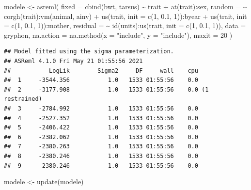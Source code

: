 \documentclass[
  12pt,
]{book}
\newenvironment{Shaded}{\begin{snugshade}}{\end{snugshade}}
\newcommand{\AttributeTok}[1]{\textcolor[rgb]{0.77,0.63,0.00}{#1}}
\newcommand{\DecValTok}[1]{\textcolor[rgb]{0.00,0.00,0.81}{#1}}
\newcommand{\FloatTok}[1]{\textcolor[rgb]{0.00,0.00,0.81}{#1}}
\newcommand{\FunctionTok}[1]{\textcolor[rgb]{0.00,0.00,0.00}{#1}}
\newcommand{\NormalTok}[1]{#1}
\newcommand{\OtherTok}[1]{\textcolor[rgb]{0.56,0.35,0.01}{#1}}
\newcommand{\SpecialCharTok}[1]{\textcolor[rgb]{0.00,0.00,0.00}{#1}}
\newcommand{\StringTok}[1]{\textcolor[rgb]{0.31,0.60,0.02}{#1}}
\begin{document}
\begin{Shaded}
\begin{Highlighting}[]
\NormalTok{modele }\OtherTok{\textless{}{-}} \FunctionTok{asreml}\NormalTok{(}
  \AttributeTok{fixed =} \FunctionTok{cbind}\NormalTok{(bwt, tarsus) }\SpecialCharTok{\textasciitilde{}}\NormalTok{ trait }\SpecialCharTok{+} \FunctionTok{at}\NormalTok{(trait)}\SpecialCharTok{:}\NormalTok{sex,}
  \AttributeTok{random =} \SpecialCharTok{\textasciitilde{}} \FunctionTok{corgh}\NormalTok{(trait)}\SpecialCharTok{:}\FunctionTok{vm}\NormalTok{(animal, ainv) }\SpecialCharTok{+}
    \FunctionTok{us}\NormalTok{(trait, }\AttributeTok{init =} \FunctionTok{c}\NormalTok{(}\DecValTok{1}\NormalTok{, }\FloatTok{0.1}\NormalTok{, }\DecValTok{1}\NormalTok{))}\SpecialCharTok{:}\NormalTok{byear }\SpecialCharTok{+}
    \FunctionTok{us}\NormalTok{(trait, }\AttributeTok{init =} \FunctionTok{c}\NormalTok{(}\DecValTok{1}\NormalTok{, }\FloatTok{0.1}\NormalTok{, }\DecValTok{1}\NormalTok{))}\SpecialCharTok{:}\NormalTok{mother,}
  \AttributeTok{residual =} \SpecialCharTok{\textasciitilde{}} \FunctionTok{id}\NormalTok{(units)}\SpecialCharTok{:}\FunctionTok{us}\NormalTok{(trait, }\AttributeTok{init =} \FunctionTok{c}\NormalTok{(}\DecValTok{1}\NormalTok{, }\FloatTok{0.1}\NormalTok{, }\DecValTok{1}\NormalTok{)),}
  \AttributeTok{data =}\NormalTok{ gryphon,}
  \AttributeTok{na.action =} \FunctionTok{na.method}\NormalTok{(}\AttributeTok{x =} \StringTok{"include"}\NormalTok{, }\AttributeTok{y =} \StringTok{"include"}\NormalTok{),}
  \AttributeTok{maxit =} \DecValTok{20}
\NormalTok{)}
\end{Highlighting}
\end{Shaded}

\begin{verbatim}
## Model fitted using the sigma parameterization.
## ASReml 4.1.0 Fri May 21 01:55:56 2021
##           LogLik        Sigma2     DF     wall    cpu
##  1     -3544.356           1.0   1533 01:55:56    0.0
##  2     -3177.908           1.0   1533 01:55:56    0.0 (1 restrained)
##  3     -2784.992           1.0   1533 01:55:56    0.0
##  4     -2527.352           1.0   1533 01:55:56    0.0
##  5     -2406.422           1.0   1533 01:55:56    0.0
##  6     -2382.062           1.0   1533 01:55:56    0.0
##  7     -2380.263           1.0   1533 01:55:56    0.0
##  8     -2380.246           1.0   1533 01:55:56    0.0
##  9     -2380.246           1.0   1533 01:55:56    0.0
\end{verbatim}

\begin{Shaded}
\begin{Highlighting}[]
\NormalTok{modele }\OtherTok{\textless{}{-}} \FunctionTok{update}\NormalTok{(modele)}
\end{Highlighting}
\end{Shaded}
\end{document}
